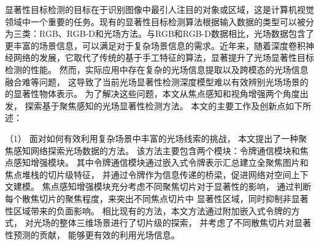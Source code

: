 显著性目标检测的目标在于识别图像中最引人注目的对象或区域，这是计算机视觉领域中一个重要的任务。现有的显著性目标检测算法根据输入数据的类型可以被分为三类：RGB、RGB-D和光场方法。与RGB和RGB-D数据相比，光场数据包含了更丰富的场景信息，可以满足对于复杂场景信息的需求。近年来，随着深度卷积神经网络的发展，它取代了传统的基于手工特征的算法，显著提升了光场显著性目标检测的性能。
%
%
%
%
然而，实际应用中存在复杂的光场信息提取以及跨模态的光场信息融合难等问题，
这导致了当前光场显著性检测深度模型难以有效辨别光场场景的的显著性物体表示。
%
%
为了解决这些问题，本文从焦点感知和视角增强两个角度出发，
探索基于聚焦感知的光场显著性检测方法。
本文的主要工作及创新点如下所述：









%
%
（1）
%
%
%
%
面对如何有效利用复杂场景中丰富的光场线索的挑战，
本文提出了一种聚焦感知网络探索光场数据的方法。
%
%
该方法主要包含两个模块：令牌通信模块和焦点感知增强模块。
%
%
其中令牌通信模块通过嵌入式令牌表示汇总建立全聚焦图片和焦点堆栈的切片级特征，
并通过令牌作为信息传递的桥梁，促进网络对空间上下文建模。
%
%
焦点感知增强模块充分考虑不同聚焦切片对于显著性的影响，
通过判断每个散焦切片的聚焦程度，来突出不同焦点切片中
显著性区域，同时抑制非显著性区域带来的负面影响。
%
%
相比现有的方法，本文方法通过附加嵌入式令牌的方式，
对光场的整体三维场景进行了切片级的探索，
并考虑了不同散焦切片对显著性预测的贡献，
能够更有效的利用光场信息。







